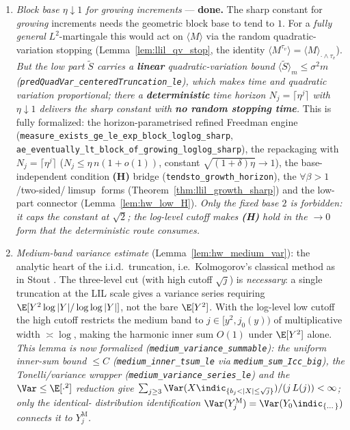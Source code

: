 \begin{enumerate}
  \item \emph{Block base $\eta\downarrow1$ for growing increments} --- \textbf{done.} The sharp
        constant for \emph{growing} increments needs the geometric block base to tend to $1$. For a
        \emph{fully general} $L^2$-martingale this would act on $\langle M\rangle$ via the random
        quadratic-variation stopping (Lemma~\ref{lem:llil_qv_stop}, the identity
        $\langle M^{\tau_v}\rangle=\langle M\rangle_{\cdot\wedge\tau_v}$). \emph{But the low part
        $\tilde S$ carries a \textbf{linear} quadratic-variation bound
        $\langle\tilde S\rangle_m\le\sigma^2 m$
        (\texttt{predQuadVar\_centeredTruncation\_le}), which makes time and quadratic variation
        proportional; there a \textbf{deterministic} time horizon $N_j=\lceil\eta^j\rceil$ with
        $\eta\downarrow1$ delivers the sharp constant with \textbf{no random stopping time}.} This is
        fully formalized: the horizon-parametrised refined Freedman engine
        (\texttt{measure\_exists\_ge\_le\_exp\_block\_loglog\_sharp},
        \texttt{ae\_eventually\_lt\_block\_of\_growing\_loglog\_sharp}), the repackaging with
        $N_j=\lceil\eta^j\rceil$ ($N_j\le\eta\,n(1+o(1))$, constant $\sqrt{(1+\delta)\eta}\to1$), the
        base-independent condition \textbf{(H)} bridge (\texttt{tendsto\_growth\_horizon}), the
        $\forall\beta>1$/two-sided/$\limsup$ forms (Theorem~\ref{thm:llil_growth_sharp}) and the
        low-part connector (Lemma~\ref{lem:hw_low_H}). \emph{Only the fixed base $2$ is forbidden: it
        caps the constant at $\sqrt2$; the log-level cutoff makes \textbf{(H)} hold in the $\to0$ form
        that the deterministic route consumes.}
  \item \emph{Medium-band variance estimate} (Lemma~\ref{lem:hw_medium_var}): the analytic heart of
        the i.i.d.\ truncation, i.e.\ Kolmogorov's classical method as in Stout \cite[Ch.~5]{Stout1974}.
        The three-level cut (with high cutoff $\sqrt j$) is \emph{necessary}: a single truncation at
        the LIL scale gives a variance series requiring $\E[Y^2\log|Y|/\log\log|Y|]$, not the bare
        $\E[Y^2]$. With the log-level low cutoff the high cutoff restricts the medium band to
        $j\in[y^2,j_0(y))$ of multiplicative width $\asymp\log$, making the harmonic inner sum $O(1)$
        under $\E[Y^2]$ alone. \emph{This lemma is now formalized
        (\texttt{medium\_variance\_summable}): the uniform inner-sum bound $\le C$
        (\texttt{medium\_inner\_tsum\_le} via \texttt{medium\_sum\_Icc\_big}), the Tonelli/variance
        wrapper (\texttt{medium\_variance\_series\_le}) and the $\Var\le\E[\cdot^2]$ reduction give
        $\sum_{j\ge3}\Var(X\indic_{\{b_j<|X|\le\sqrt j\}})/(j\,L(j))<\infty$; only the identical-%
        distribution identification $\Var(Y_j^{\mathrm M})=\Var(Y_0\indic_{\{\dots\}})$ connects it to
        $Y_j^{\mathrm M}$.}
\end{enumerate}
